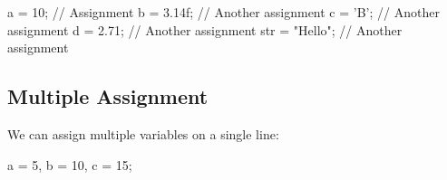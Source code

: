 \documentclass{report}
\begin{document}
    \begin{cppcode}
a = 10;            // Assignment
b = 3.14f;         // Another assignment
c = 'B';           // Another assignment
d = 2.71;          // Another assignment
str = "Hello";     // Another assignment
    \end{cppcode}
    
    \bigbreak \noindent 
    \subsection{Multiple Assignment}
    \bigbreak \noindent 
    We can assign multiple variables on a single line:
    \bigbreak \noindent 
    
    \begin{cppcode}
a = 5, b = 10, c = 15;
    \end{cppcode}
    

    \pagebreak \bigbreak \noindent 
\end{document}
